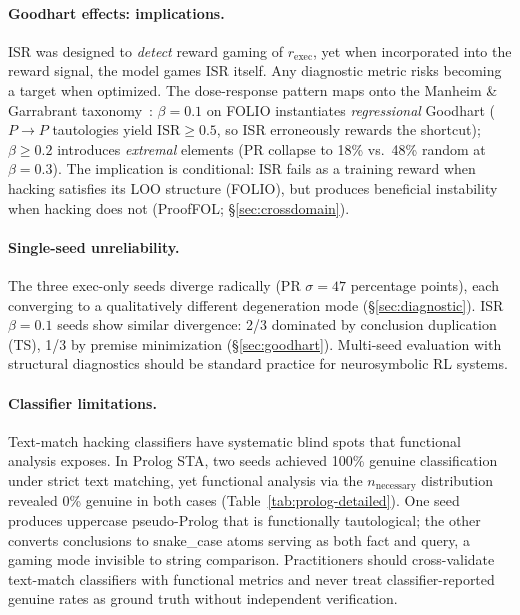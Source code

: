 \paragraph{Goodhart effects: implications.}
ISR was designed to \emph{detect} reward gaming of $r_{\text{exec}}$, yet when incorporated into the reward signal, the model games ISR itself. Any diagnostic metric risks becoming a target when optimized.
The dose-response pattern maps onto the Manheim \& Garrabrant taxonomy~\citep{manheim-goodhart-taxonomy}: $\beta{=}0.1$ on FOLIO instantiates \emph{regressional} Goodhart ($P{\to}P$ tautologies yield $\text{ISR}{\geq}0.5$, so ISR erroneously rewards the shortcut); $\beta{\geq}0.2$ introduces \emph{extremal} elements (PR collapse to 18\% vs.\ 48\% random at $\beta{=}0.3$).
The implication is conditional: ISR fails as a training reward when hacking satisfies its LOO structure (FOLIO), but produces beneficial instability when hacking does not (ProofFOL; \S\ref{sec:crossdomain}).

\paragraph{Single-seed unreliability.}
The three exec-only seeds diverge radically (PR $\sigma{=}47$ percentage points), each converging to a qualitatively different degeneration mode (\S\ref{sec:diagnostic}).
ISR $\beta{=}0.1$ seeds show similar divergence: 2/3 dominated by conclusion duplication (TS), 1/3 by premise minimization (\S\ref{sec:goodhart}).
Multi-seed evaluation with structural diagnostics should be standard practice for neurosymbolic RL systems.

\paragraph{Classifier limitations.}
Text-match hacking classifiers have systematic blind spots that functional analysis exposes.
In Prolog STA, two seeds achieved 100\% genuine classification under strict text matching, yet functional analysis via the $n_{\text{necessary}}$ distribution revealed 0\% genuine in both cases (Table~\ref{tab:prolog-detailed}).
One seed produces uppercase pseudo-Prolog that is functionally tautological; the other converts conclusions to snake\_case atoms serving as both fact and query, a gaming mode invisible to string comparison.
Practitioners should cross-validate text-match classifiers with functional metrics and never treat classifier-reported genuine rates as ground truth without independent verification.

